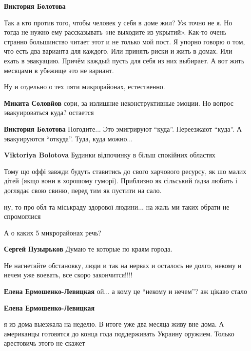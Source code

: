 \begin{itemize}
\begin{itemize}
\textbf{Виктория Болотова} 

Так а кто против того, чтобы человек у себя в доме жил? Уж точно не я. Но тогда
не нужно ему рассказывать «не выходите из укрытий». Как-то очень странно
большинство читает этот и не только мой пост. Я упорно говорю о том, что есть
два варианта для каждого. Или принять риски и жить в домах. Или ехать в
эвакуацию. Причём каждый пусть для себя из них выбирает. А вот жить месяцами в
убежище это не вариант.

Ну и отдельно о тех пяти микрорайонах, естественно.

\textbf{Микита Соловйов} сори, за излишние неконструктивные эмоции. Но вопрос эвакуироваться куда? остается

\textbf{Виктория Болотова} Погодите... Это эмигрируют \enquote{куда}. Переезжают \enquote{куда}. А эвакуируются \enquote{откуда}. Туда, куда можно...

\textbf{Viktoriya Bolotova} Будинки відпочинку в більш спокійних областях

\end{itemize} %


Тому що оффі завжди будуть ставитись до свого харчового ресурсу, як шо малих
дітей (якщо вони в хорошому гуморі). Приблизно як сільський ґадза любить і
доглядає свою свиню, перед тим як пустити на сало.

ну, то про обл та міськраду здорової людини... на жаль ми таких обрати не спромоглися

А о каких 5 микрорайонах речь?

\textbf{Сергей Пузырьков} Думаю те которые по краям города.


Не нагнетайте обстановку, люди и так на нервах и осталось не долго, некому и
нечем уже воевать, все скоро закончится!!!!

\begin{itemize} %
\textbf{Елена Ермошенко-Левицкая} ой... а кому це \enquote{некому и нечем}? аж цікаво стало

\textbf{Елена Ермошенко-Левицкая} 

я из дома выезжала на неделю. В итоге уже два месяца живу вне дома. А
американцы готовятся до конца года поддерживать Украину оружием. Только
арестовичь этого не скажет


\end{itemize}
\end{itemize}
